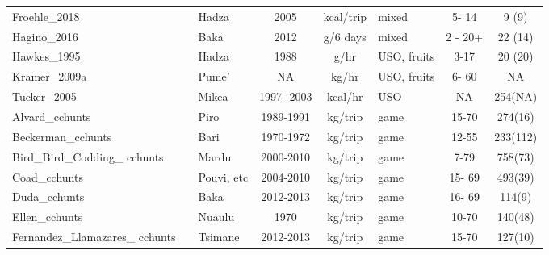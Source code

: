 \begin{landscape}
\begin{longtable}{M{2.6cm} M{3.6cm} M{1.5cm} c c M{1cm} c c}
Froehle\_2018                  & \cite{froehle_physical_2019}              & Hadza           & 2005       & kcal/trip & mixed              & 5- 14   & 9 (9)       \\
Hagino\_2016                   & \cite{hagino_high_2016}                   & Baka            & 2012       & g/6 days  & mixed              & 2 - 20+ & 22 (14)     \\
Hawkes\_1995                   & \cite{hawkes_hadza_1995}                  & Hadza           & 1988       & g/hr      & USO, fruits        & 3-17    & 20 (20)     \\
Kramer\_2009a                  & \cite{kramer_early_2009}                  & Pume'           & NA         & kg/hr     & USO, fruits        & 6- 60   & NA          \\
Tucker\_2005                   & \cite{tucker_growing_2005}                & Mikea           & 1997- 2003 & kcal/hr   & USO                & NA      & 254(NA)     \\
Alvard\_cchunts                & \cite{alvard_shotguns_1995}               & Piro            & 1989-1991  & kg/trip   & game               & 15-70   & 274(16)     \\
Beckerman\_cchunts             & \cite{beckerman_ecology_2013}             & Bari            & 1970-1972  & kg/trip   & game               & 12-55   & 233(112)    \\
Bird\_Bird\_Codding\_ cchunts     & \cite{bird_pursuit_2009}                  & Mardu           & 2000-2010  & kg/trip   & game               & 7-79    & 758(73)     \\
Coad\_cchunts                  & \cite{coad_bushmeat_2008}                 & Pouvi, etc    & 2004-2010  & kg/trip   & game               & 15- 69  & 493(39)     \\
Duda\_cchunts                  & \cite{reyes-garcia_adaptive_2016}         & Baka            & 2012-2013  & kg/trip   & game               & 16- 69  & 114(9)      \\
Ellen\_cchunts                 & \cite{ellen_individual_1996}              & Nuaulu          & 1970       & kg/trip   & game               & 10-70   & 140(48)     \\
Fernandez\_Llamazares\_ cchunts  & \cite{reyes-garcia_adaptive_2016}         & Tsimane         & 2012-2013  & kg/trip   & game               & 15-70   & 127(10)     \\

\end{longtable}
\end{landscape}
